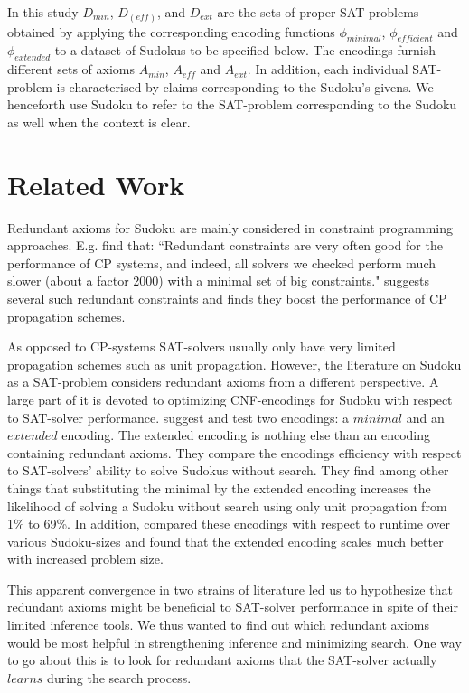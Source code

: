 \documentclass{article}
\begin{document}
In this study $D_{min}$, $D_(eff)$, and $D_{ext}$ are the sets of proper SAT-problems obtained by applying the corresponding encoding functions $\phi_{minimal}$, $\phi_{efficient}$ and $\phi_{extended}$ to a dataset of Sudokus to be specified below. The encodings furnish different sets of axioms $A_{min}$, $A_{eff}$ and $A_{ext}$. In addition, each individual SAT-problem is characterised by claims corresponding to the Sudoku's givens. We henceforth use Sudoku to refer to the SAT-problem corresponding to the Sudoku as well when the context is clear.

\section{Related Work} \label{related work}

Redundant axioms for Sudoku are mainly considered in constraint programming approaches. E.g.  find that: ``Redundant constraints are very often good for the performance of CP systems,
and indeed, all solvers we checked perform much slower (about a factor 2000) with
a minimal set of big constraints."  suggests several such redundant constraints and finds they boost the performance of CP propagation schemes.

As opposed to CP-systems SAT-solvers usually only have very limited propagation schemes such as unit propagation. However, the literature on Sudoku as a SAT-problem considers redundant axioms from a different perspective. A large part of it is devoted to optimizing CNF-encodings for Sudoku with respect to SAT-solver performance.  suggest and test two encodings: a $minimal$ and an $extended$ encoding. The extended encoding is nothing else than an encoding containing redundant axioms. They compare the encodings efficiency
with respect to SAT-solvers' ability to solve Sudokus without search. They find among other things that substituting the minimal by the extended encoding increases the likelihood of solving a Sudoku without search using only unit propagation from 1\% to 69\%. In addition,  compared these encodings with respect to runtime over various Sudoku-sizes and found that the extended encoding scales much better with increased problem size.

This apparent convergence in two strains of literature led us to hypothesize that redundant axioms might be beneficial to SAT-solver performance in spite of their limited inference tools. We thus wanted to find out which redundant axioms would be most helpful in strengthening inference and minimizing search. One way to go about this is to look for redundant axioms that the SAT-solver actually $learns$ during the search process.
\end{document}
